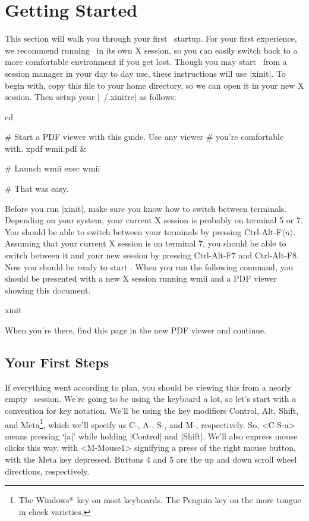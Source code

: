 \chapter{Getting Started}

This section will walk you through your first \wmii\ startup.
For your first experience, we recommend running \wmii\ in its
own X session, so you can easily switch back to a more
comfortable environment if you get lost. Though you may start
\wmii\ from a session manager in your day to day use, these
instructions will use |xinit|. To begin with, copy this file
to your home directory, so we can open it in your new X session.
Then setup your |~/.xinitrc| as follows:

\begin{code}
  cd

  # Start a PDF viewer with this guide. Use any viewer
  # you're comfortable with.
  xpdf wmii.pdf &

  # Launch wmii
  exec wmii

  # That was easy.
\end{code}

Before you run |xinit|, make sure you know how to switch
between terminals. Depending on your system, your current X
session is probably on terminal 5 or 7. You should be able to
switch between your terminals by pressing
Ctrl-Alt-F$\langle n\rangle$. Assuming that your current X
session is on terminal 7, you should be able to switch between
it and your new session by pressing Ctrl-Alt-F7 and Ctrl-Alt-F8.
Now you should be ready to start \wmii. When you run the
following command, you should be presented with a new X session
running wmii and a PDF viewer showing this document.

\begin{code}
  xinit
\end{code}

When you're there, find this page in the new PDF viewer and
continue.

\section{Your First Steps}

If everything went according to plan, you should be viewing this
from a nearly empty \wmii\ session. We're going to be using the
keyboard a lot, so let's start with a convention for key
notation. We'll be using the key modifiers Control, Alt, Shift,
and Meta\footnote{The Windows$^{\mbox{\tiny®}}$ key on most
keyboards. The Penguin key on the more tongue in cheek
varieties.}, which we'll specify as C-, A-, S-, and M-,
respectively. So, <C-S-a> means pressing ‘|a|’ while holding
|Control| and |Shift|.  We'll also express mouse clicks this
way, with <M-Mouse1> signifying a press of the right mouse
button, with the Meta key depressed.  Buttons 4 and 5 are the up
and down scroll wheel directions, respectively.

